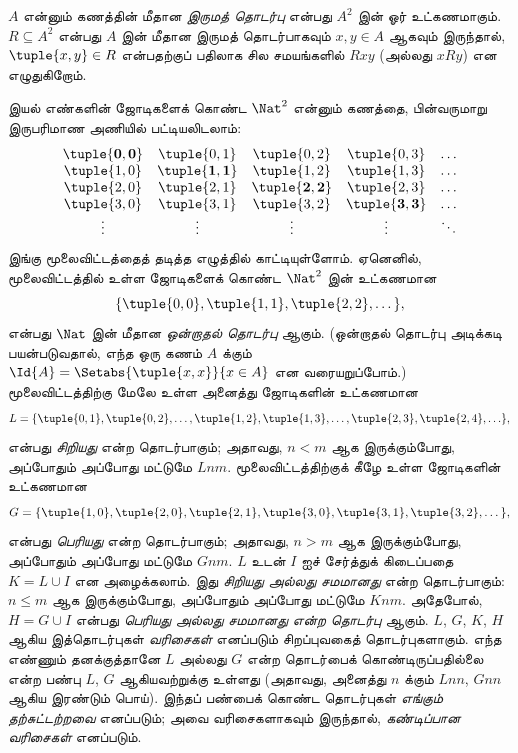 \documentclass[../../../include/open-logic-section]{subfiles}
\begin{document}
\begin{defn}[இருமத் தொடர்பு]
$A$ என்னும் கணத்தின் மீதான \emph{இருமத் தொடர்பு} என்பது
$A^{2}$ இன் ஓர் உட்கணமாகும்.
$R \subseteq A^{2}$ என்பது $A$ இன் மீதான இருமத் தொடர்பாகவும்
$x, y \in A$ ஆகவும் இருந்தால், $\tuple{x, y} \in R$ என்பதற்குப் பதிலாக
சில சமயங்களில் $Rxy$ (அல்லது $xRy$) என எழுதுகிறோம்.
\end{defn}

\begin{ex}
இயல் எண்களின் ஜோடிகளைக் கொண்ட $\Nat^{2}$ என்னும் கணத்தை,
பின்வருமாறு இருபரிமாண அணியில் பட்டியலிடலாம்:
\[
  \begin{array}{ccccc}
  \mathbf{\tuple{ 0,0 }} & \tuple{ 0,1 } &
    \tuple{ 0,2 } & \tuple{ 0,3 } & \ldots\\
  \tuple{ 1,0 } & \mathbf{\tuple{ 1,1 }} &
    \tuple{ 1,2 } & \tuple{ 1,3 } & \ldots\\
  \tuple{ 2,0 } & \tuple{ 2,1 } &
    \mathbf{\tuple{ 2,2 }} & \tuple{ 2,3 } & \ldots\\
  \tuple{ 3,0 } & \tuple{ 3,1 } & \tuple{ 3,2 } &
    \mathbf{\tuple{ 3,3 }} & \ldots\\
  \vdots & \vdots & \vdots & \vdots & \mathbf{\ddots}
  \end{array}
\]
இங்கு மூலைவிட்டத்தைத் தடித்த எழுத்தில் காட்டியுள்ளோம்.
ஏனெனில், மூலைவிட்டத்தில் உள்ள ஜோடிகளைக் கொண்ட $\Nat^2$ இன் உட்கணமான
\[
  \{\tuple{0,0 }, \tuple{ 1,1 }, \tuple{ 2,2 }, \dots\},
  \]
என்பது $\Nat$ இன் மீதான \emph{ஒன்றாதல் தொடர்பு} ஆகும்.
(ஒன்றாதல் தொடர்பு அடிக்கடி பயன்படுவதால், எந்த ஒரு கணம் $A$ க்கும்
$\Id{A}=\Setabs{\tuple{ x,x }}{x \in A}$ என வரையறுப்போம்.)
மூலைவிட்டத்திற்கு மேலே உள்ள அனைத்து ஜோடிகளின் உட்கணமான
\[
  L = \{\tuple{ 0,1 },\tuple{ 0,2 },\ldots,\tuple{ 1,2 },
  \tuple{ 1,3 }, \dots, \tuple{ 2,3 }, \tuple{ 2,4 },\ldots\},
\]
என்பது \emph{சிறியது} என்ற தொடர்பாகும்; அதாவது,
$n<m$ ஆக இருக்கும்போது, அப்போதும் அப்போது மட்டுமே $Lnm$.
மூலைவிட்டத்திற்குக் கீழே உள்ள ஜோடிகளின் உட்கணமான
\[
  G=\{ \tuple{ 1,0 },\tuple{ 2,0 },\tuple{
    2,1 }, \tuple{ 3,0 },\tuple{ 3,1 },\tuple{ 3,2 }, \dots\},
\]
என்பது \emph{பெரியது} என்ற தொடர்பாகும்; அதாவது,
$n>m$ ஆக இருக்கும்போது, அப்போதும் அப்போது மட்டுமே $Gnm$.
$L$ உடன் $I$ ஐச் சேர்த்துக் கிடைப்பதை $K=L\cup I$ என அழைக்கலாம்.
இது \emph{சிறியது அல்லது சமமானது} என்ற தொடர்பாகும்:
$n \le m$ ஆக இருக்கும்போது, அப்போதும் அப்போது மட்டுமே $Knm$.
அதேபோல், $H=G \cup I$ என்பது \emph{பெரியது அல்லது சமமானது என்ற தொடர்பு} ஆகும்.
$L$, $G$, $K$, $H$ ஆகிய இத்தொடர்புகள் \emph{வரிசைகள்}
எனப்படும் சிறப்புவகைத் தொடர்புகளாகும்.
எந்த எண்ணும் தனக்குத்தானே $L$ அல்லது $G$ என்ற தொடர்பைக் கொண்டிருப்பதில்லை
என்ற பண்பு $L$, $G$ ஆகியவற்றுக்கு உள்ளது
(அதாவது, அனைத்து $n$ க்கும் $Lnn$, $Gnn$ ஆகிய இரண்டும் பொய்).
இந்தப் பண்பைக் கொண்ட தொடர்புகள் \emph{எங்கும் தற்சுட்டற்றவை} எனப்படும்;
அவை வரிசைகளாகவும் இருந்தால், \emph{கண்டிப்பான வரிசைகள்} எனப்படும்.
\end{ex}
\end{document}
